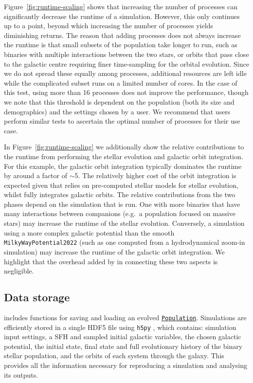 \documentclass[twocolumn, twocolappendix, oneside]{aastex631}
\newcommand{\codeLink}[2]{{\href{https://cogsworth.readthedocs.io/en/latest/api/cogsworth.#2.#1.html}{\color{codecolour} \texttt{#1}}}}
\begin{document}
Figure~\ref{fig:runtime-scaling} shows that increasing the number of processes can significantly decrease the runtime of a simulation. However, this only continues up to a point, beyond which increasing the number of processes yields diminishing returns. The reason that adding processes does not always increase the runtime is that small subsets of the population take longer to run, such as binaries with multiple interactions between the two stars, or orbits that pass close to the galactic centre requiring finer time-sampling for the orbital evolution. Since we do not spread these equally among processes, additional resources are left idle while the complicated subset runs on a limited number of cores. In the case of this test, using more than 16 processes does not improve the performance, though we note that this threshold is dependent on the population (both its size and demographics) and the settings chosen by a user. We recommend that users perform similar tests to ascertain the optimal number of processes for their use case.

In Figure~\ref{fig:runtime-scaling} we additionally show the relative contributions to the runtime from performing the stellar evolution and galactic orbit integration. For this example, the galactic orbit integration typically dominates the runtime by around a factor of $\sim$5. The relatively higher cost of the orbit integration is expected given that \cosmic relies on pre-computed stellar models for stellar evolution, whilst \gala fully integrates galactic orbits. The relative contributions from the two phases depend on the simulation that is run. One with more binaries that have many interactions between companions (e.g.\ a population focused on massive stars) may increase the runtime of the stellar evolution. Conversely, a simulation using a more complex galactic potential than the smooth \texttt{MilkyWayPotential2022} (such as one computed from a hydrodynamical zoom-in simulation) may increase the runtime of the galactic orbit integration. We highlight that the overhead added by \cogsworth in connecting these two aspects is negligible.

\subsection{Data storage}\label{sec:data}

\cogsworth includes functions for saving and loading an evolved \codeLink{Population}{pop}. Simulations are efficiently stored in a single HDF5 file using \texttt{h5py} \citep{collette_python_hdf5_2014}, which contains: simulation input settings, a SFH and sampled initial galactic variables, the chosen galactic potential, the initial state, final state and full evolutionary history of the binary stellar population, and the orbits of each system through the galaxy. This provides all the information necessary for  reproducing a simulation and analysing its outputs.
\end{document}
